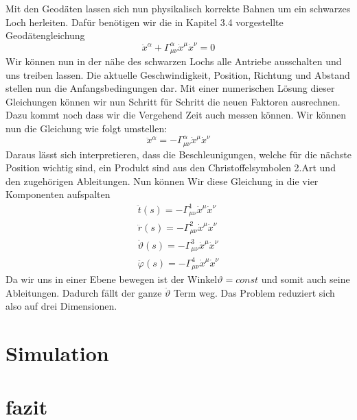 \begin{refsection}
	Mit den Geodäten lassen sich nun physikalisch korrekte Bahnen um ein schwarzes Loch herleiten. Dafür benötigen wir die in Kapitel 3.4 vorgestellte Geodätengleichung	
	\begin{equation}
	\ddot{x}^{\alpha} + \Gamma^{\alpha}_{\mu\nu}\dot{x}^{\mu}\dot{x}^{\nu} = 0
	\end{equation}	
	Wir können nun in der nähe des schwarzen Lochs alle Antriebe ausschalten und uns treiben lassen. Die aktuelle Geschwindigkeit, Position, Richtung und Abstand stellen nun die Anfangsbedingungen dar. Mit einer numerischen Lösung dieser Gleichungen können wir nun Schritt für Schritt die neuen Faktoren ausrechnen. Dazu kommt noch dass wir die Vergehend Zeit auch messen können.
	Wir k\"onnen nun die Gleichung wie folgt umstellen:	
	\begin{equation}
	\ddot{x}^{\alpha} = -\Gamma^{\alpha}_{\mu\nu}\dot{x}^{\mu}\dot{x}^{\nu}
	\end{equation}
	Daraus lässt sich interpretieren, dass die Beschleunigungen, welche für die nächste Position wichtig sind, ein Produkt sind aus den Christoffelsymbolen 2.Art und den zugehörigen Ableitungen.
	Nun können Wir diese Gleichung in die vier Komponenten aufspalten
	\begin{align*}
		\ddot{t}(s) = -\Gamma^{1}_{\mu\nu}\dot{x}^{\mu}\dot{x}^{\nu}\\
		\ddot{r}(s) = -\Gamma^{2}_{\mu\nu}\dot{x}^{\mu}\dot{x}^{\nu}\\
		\ddot{\vartheta}(s) = -\Gamma^{3}_{\mu\nu}\dot{x}^{\mu}\dot{x}^{\nu}\\
		\ddot{\varphi}(s) = -\Gamma^{4}_{\mu\nu}\dot{x}^{\mu}\dot{x}^{\nu}		
	\end{align*}
	Da wir uns in einer Ebene bewegen ist der Winkel$\vartheta = const$ und somit auch seine Ableitungen. Dadurch fällt der   ganze $\ddot{\vartheta}$ Term weg. Das Problem reduziert sich also auf drei Dimensionen.	
	
	
	
	\section{Simulation}
	
	
	\section{fazit}
	
	
	


	\printbibliography[heading=subbibliography]
	\end{refsection}

